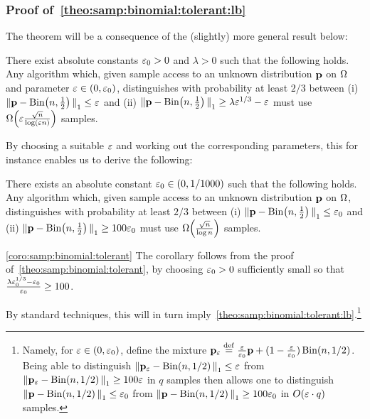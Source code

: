 \subsubsection{Proof of~\cref{theo:samp:binomial:tolerant:lb}}\label{app:binomial:tolerant:lb}
The theorem will be a consequence of the (slightly) more general result below:
\begin{theorem}\label{theo:samp:binomial:tolerant}
  There exist absolute constants $\varepsilon_0> 0$ and $\lambda > 0$ such that the following holds. Any algorithm which, given sample access to an unknown distribution $\mathbf{p}$ on ${\Omega}$ and parameter $\varepsilon \in (0,\varepsilon_0)$, distinguishes with probability at least $2/3$ between \textsf{(i)} ${\lVert\mathbf{p}-\operatorname{Bin}\!\left( n, \frac{1}{2} \right){\rVert}}_1 \leq \varepsilon$ and \textsf{(ii)} ${\lVert\mathbf{p}-\operatorname{Bin}\!\left( n, \frac{1}{2} \right){\rVert}}_1 \geq \lambda\varepsilon^{1/3}-\varepsilon$ must use $\bigOmega{\eps\frac{\sqrt{n}}{\log(\eps n)}}$ samples.
\end{theorem}
\noindent By choosing a suitable $\varepsilon$ and working out the corresponding parameters, this for instance enables us to derive the following:
\begin{corollary}\label{coro:samp:binomial:tolerant}
  There exists an absolute constant $\varepsilon_0 \in(0,1/1000)$ such that the following holds. Any algorithm which, given sample access to an unknown distribution $\mathbf{p}$ on ${\Omega}$, distinguishes with probability at least $2/3$ between \textsf{(i)} ${\lVert\mathbf{p}-\operatorname{Bin}\!\left( n, \frac{1}{2} \right){\rVert}}_1 \leq \varepsilon_0$ and \textsf{(ii)} ${\lVert\mathbf{p}-\operatorname{Bin}\!\left( n, \frac{1}{2} \right){\rVert}}_1 \geq 100\varepsilon_0$ must use $\bigOmega{\frac{\sqrt{n}}{\log n}}$ samples.
\end{corollary}
\begin{proofof}{\cref{coro:samp:binomial:tolerant}}
The corollary follows from the proof of~\cref{theo:samp:binomial:tolerant}, by choosing $\varepsilon_0>0$ sufficiently small so that $\frac{\lambda\varepsilon_0^{1/3}-\varepsilon_0}{\varepsilon_0} \geq 100$.
\end{proofof}
\noindent By standard techniques, this will in turn imply~\cref{theo:samp:binomial:tolerant:lb}.\footnote{Namely, for $\varepsilon\in(0,\varepsilon_0)$, define the  mixture $\mathbf{p}_\varepsilon \stackrel{\rm def}{=} \frac{\varepsilon}{\varepsilon_0}\mathbf{p}+(1-\frac{\varepsilon}{\varepsilon_0})\operatorname{Bin}\!\left( n, 1/2 \right)$. Being able to distinguish ${\lVert\mathbf{p}_\varepsilon-\operatorname{Bin}\!\left( n, 1/2 \right){\rVert}}_1 \leq \varepsilon$ from ${\lVert\mathbf{p}_\varepsilon-\operatorname{Bin}\!\left( n, 1/2 \right){\rVert}}_1 \geq 100\varepsilon$ in $q$ samples then allows one to distinguish ${\lVert\mathbf{p}-\operatorname{Bin}\!\left( n, 1/2 \right){\rVert}}_1 \leq \varepsilon_0$ from ${\lVert\mathbf{p}-\operatorname{Bin}\!\left( n, 1/2 \right){\rVert}}_1 \geq 100\varepsilon_0$ in $O(\varepsilon\cdot q)$ samples.}

